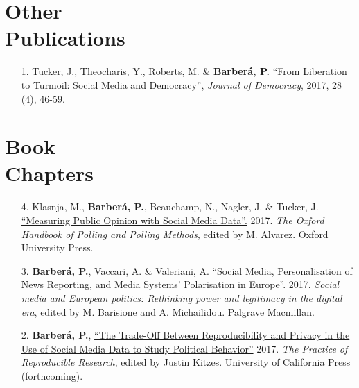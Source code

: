 \documentclass[margin,line,11pt]{resume}
\begin{document}
\begin{resume}
\section{\mysidestyle Other\\Publications}
    
    \vspace{.15cm}    
\begin{itemize}[leftmargin=5.5mm]
\item[1.]  Tucker, J., Theocharis, Y., Roberts, M. \& \textbf{Barber\'{a}, P.} \href{https://muse.jhu.edu/article/671987/pdf}{``From Liberation to Turmoil: Social Media and Democracy''}, \textit{Journal of Democracy}, 2017, 28 (4), 46-59.   
\end{itemize}        %

    \section{\mysidestyle Book\\Chapters} 
\vspace{.15cm}    
\begin{itemize}[leftmargin=5.5mm]
\item[4.] Klasnja, M., \textbf{Barber\'{a}, P.}, Beauchamp, N., Nagler, J. \& Tucker, J. \href{http://www.oxfordhandbooks.com/view/10.1093/oxfordhb/9780190213299.001.0001/oxfordhb-9780190213299-e-3}{``Measuring Public Opinion with Social Media Data''.} 2017. \textit{The Oxford Handbook of Polling and Polling Methods}, edited by M. Alvarez. Oxford University Press.

\item[3.] \textbf{Barber\'{a}, P.}, Vaccari, A. \& Valeriani, A. \href{https://link.springer.com/chapter/10.1057/978-1-137-59890-5_2}{``Social Media, Personalisation of News Reporting, and Media Systems' Polarisation in Europe''}. 2017. \textit{Social media and European politics: Rethinking power and legitimacy in the digital era}, edited by M. Barisione and A. Michailidou. Palgrave Macmillan.
    
\item[2.] \textbf{Barber\'{a}, P.}, \href{https://www.practicereproducibleresearch.org/case-studies/barbera.html}{``The Trade-Off Between Reproducibility and Privacy in the Use of Social Media Data to Study Political Behavior''} 2017. \textit{The Practice of Reproducible Research}, edited by Justin Kitzes. University of California Press (forthcoming).
    

\end{itemize}
\end{resume}
\end{document}
